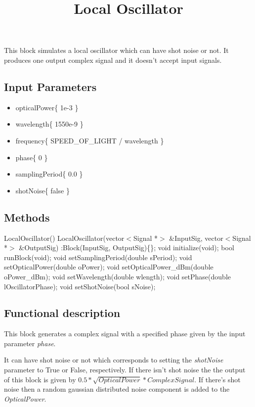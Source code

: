 \documentclass[a4paper]{article}
\title{Local Oscillator}
\begin{document}
\maketitle

This block simulates a local oscillator which can have shot noise or not. It produces one output complex signal and it doesn't accept input signals. 

\subsection*{Input Parameters}

\begin{itemize}
	\item opticalPower\{ 1e-3 \} 
	\item wavelength\{ 1550e-9 \}
	\item frequency\{ SPEED\_OF\_LIGHT / wavelength \}
	\item phase\{ 0 \}
	\item samplingPeriod\{ 0.0 \}
	\item shotNoise\{ false \}
\end{itemize}

\subsection*{Methods}
 
LocalOscillator() {}
\bigbreak
LocalOscillator(vector$<$Signal *$>$ \&InputSig, vector$<$Signal *$>$ \&OutputSig) :Block(InputSig, OutputSig)\{\};
\bigbreak
void initialize(void);
\bigbreak
bool runBlock(void);
\bigbreak
void setSamplingPeriod(double sPeriod);
\bigbreak
void setOpticalPower(double oPower);
\bigbreak
void setOpticalPower\_dBm(double oPower\_dBm); 
\bigbreak
void setWavelength(double wlength);
\bigbreak
void setPhase(double lOscillatorPhase); 
\bigbreak
void setShotNoise(bool sNoise);

\subsection*{Functional description}

This block generates a complex signal with a specified phase given by the input parameter \textit{phase}.

It can have shot noise or not which corresponds to setting the \textit{shotNoise} parameter to True or False, respectively. If there isn't shot noise the the output of this block is given by $0.5*\sqrt{OpticalPower}*ComplexSignal$. If there's shot noise then a random gaussian distributed noise component is added to the \textit{OpticalPower}. 
\end{document}
